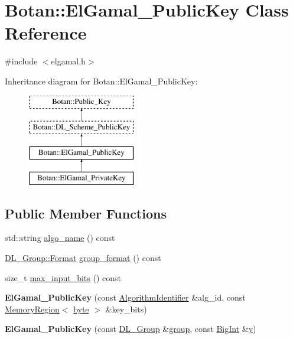 \hypertarget{classBotan_1_1ElGamal__PublicKey}{\section{Botan\-:\-:El\-Gamal\-\_\-\-Public\-Key Class Reference}
\label{classBotan_1_1ElGamal__PublicKey}
}


{\ttfamily \#include $<$elgamal.\-h$>$}

Inheritance diagram for Botan\-:\-:El\-Gamal\-\_\-\-Public\-Key\-:\begin{figure}[H]
\begin{center}
\leavevmode
\includegraphics[height=4.000000cm]{classBotan_1_1ElGamal__PublicKey}
\end{center}
\end{figure}
\subsection*{Public Member Functions}
\begin{DoxyCompactItemize}
\item 
std\-::string \hyperlink{classBotan_1_1ElGamal__PublicKey_aee61fa47d12dc71220a73d16642b6c84}{algo\-\_\-name} () const 
\item 
\hyperlink{classBotan_1_1DL__Group_ac602a30420ceec03fa181a10b09312a7}{D\-L\-\_\-\-Group\-::\-Format} \hyperlink{classBotan_1_1ElGamal__PublicKey_ab5395b48e5debfc909204c75448b072d}{group\-\_\-format} () const 
\item 
size\-\_\-t \hyperlink{classBotan_1_1ElGamal__PublicKey_acdecc6598146478862e078b694ae3865}{max\-\_\-input\-\_\-bits} () const 
\item 
\hypertarget{classBotan_1_1ElGamal__PublicKey_afbbcc6e69f902289b6fd05d4e8573893}{{\bfseries El\-Gamal\-\_\-\-Public\-Key} (const \hyperlink{classBotan_1_1AlgorithmIdentifier}{Algorithm\-Identifier} \&alg\-\_\-id, const \hyperlink{classBotan_1_1MemoryRegion}{Memory\-Region}$<$ \hyperlink{namespaceBotan_a7d793989d801281df48c6b19616b8b84}{byte} $>$ \&key\-\_\-bits)}\label{classBotan_1_1ElGamal__PublicKey_afbbcc6e69f902289b6fd05d4e8573893}

\item 
\hypertarget{classBotan_1_1ElGamal__PublicKey_adff2f32b9f76ab9ef6e8fef2f8a7f18c}{{\bfseries El\-Gamal\-\_\-\-Public\-Key} (const \hyperlink{classBotan_1_1DL__Group}{D\-L\-\_\-\-Group} \&\hyperlink{classBotan_1_1DL__Scheme__PublicKey_a99e61704126f6c0fcdf5475027a46500}{group}, const \hyperlink{classBotan_1_1BigInt}{Big\-Int} \&\hyperlink{classBotan_1_1DL__Scheme__PublicKey_ab4e7d9e233e3c89de236699ea5774802}{y})}\label{classBotan_1_1ElGamal__PublicKey_adff2f32b9f76ab9ef6e8fef2f8a7f18c}

\end{DoxyCompactItemize}
